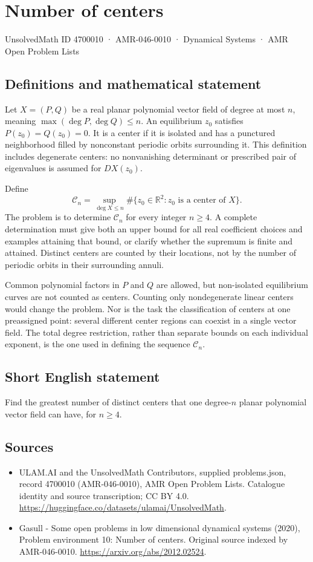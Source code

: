 \documentclass[11pt,a4paper]{article}
\begin{document}
\section*{Number of centers}\label{4700010}
{\small UnsolvedMath ID 4700010 · AMR-046-0010 · Dynamical Systems · AMR Open Problem Lists}
\subsection{Definitions and mathematical statement}
Let $X=(P,Q)$ be a real planar polynomial vector field of degree at most $n$,
meaning $\max(\deg P,\deg Q)\le n$. An equilibrium $z_0$ satisfies
$P(z_0)=Q(z_0)=0$. It is a center if it is isolated and has a punctured
neighborhood filled by nonconstant periodic orbits surrounding it.
This definition includes degenerate centers: no nonvanishing determinant
or prescribed pair of eigenvalues is assumed for $DX(z_0)$.

Define
\[
 \mathcal C_n=\sup_{\deg X\le n}
       \#\{z_0\in\mathbb R^2:z_0\text{ is a center of }X\}.
\]
The problem is to determine $\mathcal C_n$ for every integer $n\ge4$.
A complete determination must give both an upper bound for all real
coefficient choices and examples attaining that bound, or clarify whether
the supremum is finite and attained. Distinct centers are counted by their
locations, not by the number of periodic orbits in their surrounding annuli.

Common polynomial factors in $P$ and $Q$ are allowed, but non-isolated
equilibrium curves are not counted as centers. Counting only nondegenerate
linear centers would change the problem. Nor is the task the classification
of centers at one preassigned point: several different center regions can
coexist in a single vector field. The total degree restriction, rather than
separate bounds on each individual exponent, is the one used in defining
the sequence $\mathcal C_n$.
\subsection{Short English statement}
Find the greatest number of distinct centers that one degree-$n$ planar polynomial vector field can have, for $n\ge4$.
\subsection{Sources}
\begin{itemize}
\item[S1] ULAM.AI and the UnsolvedMath Contributors, supplied problems.json, record 4700010 (AMR-046-0010), AMR Open Problem Lists. Catalogue identity and source transcription; CC BY 4.0.
\url{https://huggingface.co/datasets/ulamai/UnsolvedMath}.
\item[S2] Gasull - Some open problems in low dimensional dynamical systems (2020), Problem environment 10: Number of centers. Original source indexed by AMR-046-0010.
\url{https://arxiv.org/abs/2012.02524}.
\end{itemize}
\end{document}
